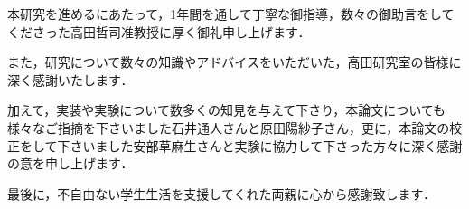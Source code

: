\begin{ackn}{}

本研究を進めるにあたって，1年間を通して丁寧な御指導，数々の御助言をしてくださった高田哲司准教授に厚く御礼申し上げます．

また，研究について数々の知識やアドバイスをいただいた，高田研究室の皆様に深く感謝いたします．

加えて，実装や実験について数多くの知見を与えて下さり，本論文についても様々なご指摘を下さいました石井通人さんと原田陽紗子さん，更に，本論文の校正をして下さいました安部草麻生さんと実験に協力して下さった方々に深く感謝の意を申し上げます．

最後に，不自由ない学生生活を支援してくれた両親に心から感謝致します．

\end{ackn}{}
\newpage
